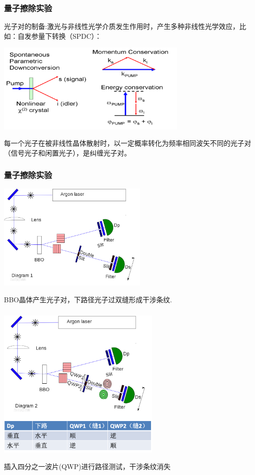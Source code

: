 \begin{frame}
    \frametitle{量子擦除实验}
    光子对的制备:激光与非线性光学介质发生作用时，产生多种非线性光学效应，比如：自发参量下转换（SPDC）： 
    \begin{center}
        \includegraphics[width=0.7\textwidth]{figs/31a.png}
    \end{center}
    每一个光子在被非线性晶体散射时，以一定概率转化为频率相同波矢不同的光子对（信号光子和闲置光子），是纠缠光子对。
\end{frame}

\begin{frame}
    \frametitle{量子擦除实验}
    \begin{center}
        \includegraphics[width=0.55\textwidth]{figs/c1.png}
    \end{center}
    BBO晶体产生光子对，下路径光子过双缝形成干涉条纹.
\end{frame} 

\begin{frame}
    \frametitle{}
    \begin{center}
        \includegraphics[width=0.6\textwidth]{figs/c2.png}
    \end{center}
    插入四分之一波片(QWP)进行路径测试，干涉条纹消失
\end{frame} 

